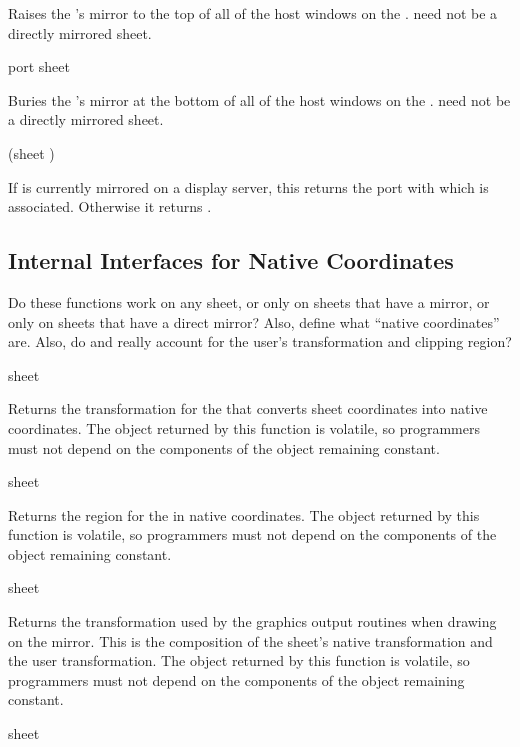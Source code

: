 Raises the  's mirror to the top of all of the host
windows on the  .   need not be a directly
mirrored sheet.

 {port sheet}

Buries the  's mirror at the bottom of all of the host
windows on the  .   need not be a directly
mirrored sheet.

 {(sheet )}

If  is currently mirrored on a display server, this returns the port
with which  is associated.  Otherwise it returns .


\subsection {Internal Interfaces for Native Coordinates}

 {Do these functions work on any sheet, or only on sheets that have
a mirror, or only on sheets that have a direct mirror?  Also, define what
``native coordinates'' are.  Also, do  and
 really account for the user's transformation and
clipping region?}

 {sheet}

Returns the transformation for the   that converts sheet
coordinates into native coordinates.  The object returned by this function is
volatile, so programmers must not depend on the components of the object
remaining constant.

 {sheet}

Returns the region for the   in native coordinates.  The
object returned by this function is volatile, so programmers must not depend on
the components of the object remaining constant.

 {sheet}

Returns the transformation used by the graphics output routines when drawing on
the mirror.  This is the composition of the sheet's native transformation and
the user transformation.  The object returned by this function is volatile, so
programmers must not depend on the components of the object remaining constant.

 {sheet}

